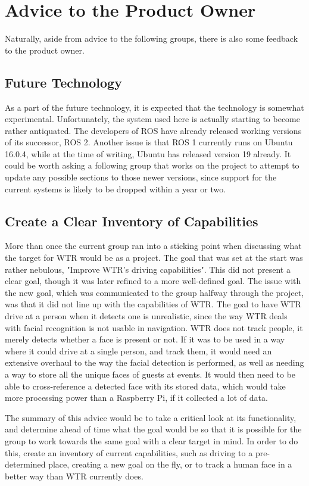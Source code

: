 \section{Advice to the Product Owner}
Naturally, aside from advice to the following groups, there is also some feedback to the product owner.

\subsection{Future Technology}
As a part of the future technology, it is expected that the technology is somewhat experimental.
Unfortunately, the system used here is actually starting to become rather antiquated.
The developers of ROS have already released working versions of its successor, ROS 2.
Another issue is that ROS 1 currently runs on Ubuntu 16.0.4, while at the time of writing, Ubuntu has released version 19 already.
It could be worth asking a following group that works on the project to attempt to update any possible sections to those newer versions, since support for the current systems is likely to be dropped within a year or two.

\subsection{Create a Clear Inventory of Capabilities}
More than once the current group ran into a sticking point when discussing what the target for WTR would be as a project.
The goal that was set at the start was rather nebulous,  "Improve WTR's driving capabilities".
This did not present a clear goal, though it was later refined to a more well-defined goal.
The issue with the new goal, which was communicated to the group halfway through the project, was that it did not line up with the capabilities of WTR.
The goal to have WTR drive at a person when it detects one is unrealistic, since the way WTR deals with facial recognition is not usable in navigation.
WTR does not track people, it merely detects whether a face is present or not.
If it was to be used in a way where it could drive at a single person, and track them, it would need an extensive overhaul to the way the facial detection is performed, as well as needing a way to store all the unique faces of guests at events.
It would then need to be able to cross-reference a detected face with its stored data, which would take more processing power than a Raspberry Pi, if it collected a lot of data.

The summary of this advice would be to take a critical look at its functionality, and determine ahead of time what the goal would be so that it is possible for the group to work towards the same goal with a clear target in mind.
In order to do this, create an inventory of current capabilities, such as driving to a pre-determined place, creating a new goal on the fly, or to track a human face in a better way than WTR currently does.

